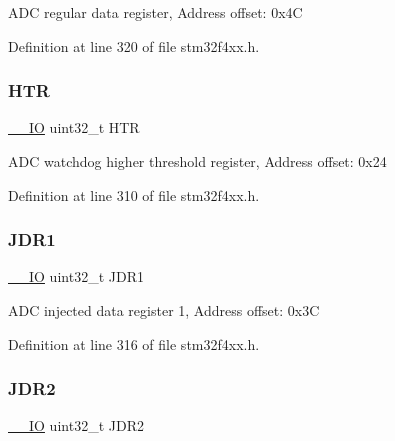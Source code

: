 A\+DC regular data register, Address offset\+: 0x4C 

Definition at line 320 of file stm32f4xx.\+h.

\mbox{\label{struct_a_d_c___type_def_a24c3512abcc90ef75cf3e9145e5dbe9b}} 
\subsubsection{\texorpdfstring{H\+TR}{HTR}}
{\footnotesize\ttfamily \hyperlink{group___c_m_s_i_s__core__definitions_gaec43007d9998a0a0e01faede4133d6be}{\+\_\+\+\_\+\+IO} uint32\+\_\+t H\+TR}

A\+DC watchdog higher threshold register, Address offset\+: 0x24 

Definition at line 310 of file stm32f4xx.\+h.

\mbox{\label{struct_a_d_c___type_def_a22fa21352be442bd02f9c26a1013d598}} 
\subsubsection{\texorpdfstring{J\+D\+R1}{JDR1}}
{\footnotesize\ttfamily \hyperlink{group___c_m_s_i_s__core__definitions_gaec43007d9998a0a0e01faede4133d6be}{\+\_\+\+\_\+\+IO} uint32\+\_\+t J\+D\+R1}

A\+DC injected data register 1, Address offset\+: 0x3C 

Definition at line 316 of file stm32f4xx.\+h.

\mbox{\label{struct_a_d_c___type_def_ae9156af81694b7a85923348be45a2167}} 
\subsubsection{\texorpdfstring{J\+D\+R2}{JDR2}}
{\footnotesize\ttfamily \hyperlink{group___c_m_s_i_s__core__definitions_gaec43007d9998a0a0e01faede4133d6be}{\+\_\+\+\_\+\+IO} uint32\+\_\+t J\+D\+R2}

